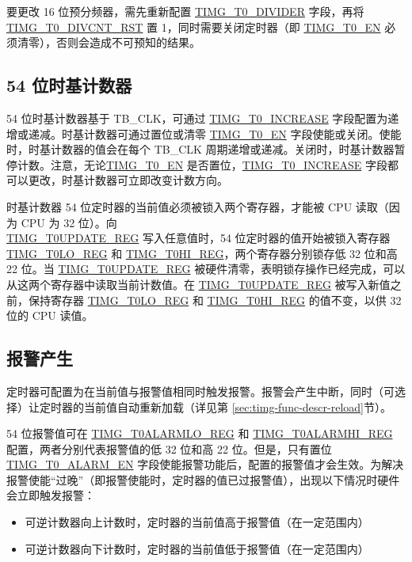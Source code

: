 \documentclass[main\_\_CN.tex]{subfiles}
\begin{document}
要更改 16 位预分频器，需先重新配置 \hyperref[fielddesc:TIMGTXDIVIDER]{TIMG\_T0\_DIVIDER} 字段，再将 \hyperref[{fielddesc:TIMGTXDIVCNTRST}]{TIMG\_T0\_DIVCNT\_RST} 置 1，同时需要关闭定时器（即 \hyperref[fielddesc:TIMGTXEN]{TIMG\_T0\_EN} 必须清零），否则会造成不可预知的结果。



\subsection{54 位时基计数器}
54 位时基计数器基于 TB\_CLK，可通过 \hyperref[fielddesc:TIMGTXINCREASE]{TIMG\_T0\_INCREASE} 字段配置为递增或递减。时基计数器可通过置位或清零 \hyperref[fielddesc:TIMGTXEN]{TIMG\_T0\_EN} 字段使能或关闭。使能时，时基计数器的值会在每个 TB\_CLK 周期递增或递减。关闭时，时基计数器暂停计数。注意，无论\hyperref[fielddesc:TIMGTXEN]{TIMG\_T0\_EN} 是否置位，\hyperref[fielddesc:TIMGTXINCREASE]{TIMG\_T0\_INCREASE} 字段都可以更改，时基计数器可立即改变计数方向。

时基计数器 54 位定时器的当前值必须被锁入两个寄存器，才能被 CPU 读取（因为 CPU 为 32 位）。向 \\\hyperref[regdesc:TIMGTXUPDATEREG]{TIMG\_T0UPDATE\_REG} 写入任意值时，54 位定时器的值开始被锁入寄存器 \hyperref[regdesc:TIMGTXLOREG]{TIMG\_T0LO\_REG} 和 \hyperref[regdesc:TIMGTXHIREG]{TIMG\_T0HI\_REG}，两个寄存器分别锁存低 32 位和高 22 位。当 \hyperref[regdesc:TIMGTXUPDATEREG]{TIMG\_T0UPDATE\_REG} 被硬件清零，表明锁存操作已经完成，可以从这两个寄存器中读取当前计数值。在 \hyperref[regdesc:TIMGTXUPDATEREG]{TIMG\_T0UPDATE\_REG} 被写入新值之前，保持寄存器 \hyperref[regdesc:TIMGTXLOREG]{TIMG\_T0LO\_REG} 和 \hyperref[regdesc:TIMGTXHIREG]{TIMG\_T0HI\_REG} 
的值不变，以供 32 位的 CPU 读值。



\subsection{报警产生}
定时器可配置为在当前值与报警值相同时触发报警。报警会产生中断，同时（可选择）让定时器的当前值自动重新加载（详见第 \ref{sec:timg-func-descr-reload}节）。

54 位报警值可在 \hyperref[regdesc:TIMGTXALARMLOREG]{TIMG\_T0ALARMLO\_REG} 和 \hyperref[regdesc:TIMGTXALARMHIREG]{TIMG\_T0ALARMHI\_REG} 配置，两者分别代表报警值的低 32 位和高 22 位。但是，只有置位 \hyperref[fielddesc:TIMGTXALARMEN]{TIMG\_T0\_ALARM\_EN} 字段使能报警功能后，配置的报警值才会生效。为解决报警使能“过晚”（即报警使能时，定时器的值已过报警值），出现以下情况时硬件会立即触发报警：
\begin{itemize}
    \item 可逆计数器向上计数时，定时器的当前值高于报警值（在一定范围内）
    \item 可逆计数器向下计数时，定时器的当前值低于报警值（在一定范围内）
\end{itemize}
\end{document}

